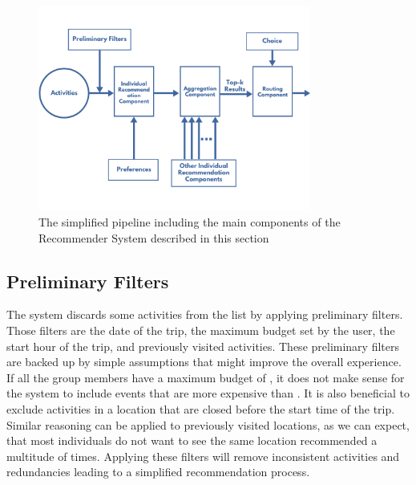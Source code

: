 \documentclass[11pt,a4paper,oneside]{article}
\begin{document}
\begin{figure}[H]
    \centering
    \includegraphics[width=0.8\textwidth]{paper/imgs/chart_ais.png}
    \caption{The simplified pipeline including the main components of the Recommender System described in this section}
    \label{fig:pipeline}
\end{figure}

\subsection{Preliminary Filters}
The system discards some activities from the list by applying preliminary filters. Those filters are the date of the trip, the maximum budget set by the user, the start hour of the trip, and previously visited activities. These preliminary filters are backed up by simple assumptions that might improve the overall experience. If all the group members have a maximum budget of , it does not make sense for the system to include events that are more expensive than . It is also beneficial to exclude activities in a location that are closed before the start time of the trip. Similar reasoning can be applied to previously visited locations, as we can expect, that most individuals do not want to see the same location recommended a multitude of times. Applying these filters will remove inconsistent activities and redundancies leading to a simplified recommendation process.
\end{document}

